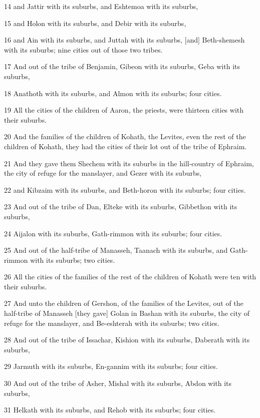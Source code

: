 \par 14 and Jattir with its suburbs, and Eshtemoa with its suburbs,
\par 15 and Holon with its suburbs, and Debir with its suburbs,
\par 16 and Ain with its suburbs, and Juttah with its suburbs, [and] Beth-shemesh with its suburbs; nine cities out of those two tribes.
\par 17 And out of the tribe of Benjamin, Gibeon with its suburbs, Geba with its suburbs,
\par 18 Anathoth with its suburbs, and Almon with its suburbs; four cities.
\par 19 All the cities of the children of Aaron, the priests, were thirteen cities with their suburbs.
\par 20 And the families of the children of Kohath, the Levites, even the rest of the children of Kohath, they had the cities of their lot out of the tribe of Ephraim.
\par 21 And they gave them Shechem with its suburbs in the hill-country of Ephraim, the city of refuge for the manslayer, and Gezer with its suburbs,
\par 22 and Kibzaim with its suburbs, and Beth-horon with its suburbs; four cities.
\par 23 And out of the tribe of Dan, Elteke with its suburbs, Gibbethon with its suburbs,
\par 24 Aijalon with its suburbs, Gath-rimmon with its suburbs; four cities.
\par 25 And out of the half-tribe of Manasseh, Taanach with its suburbs, and Gath-rimmon with its suburbs; two cities.
\par 26 All the cities of the families of the rest of the children of Kohath were ten with their suburbs.
\par 27 And unto the children of Gershon, of the families of the Levites, out of the half-tribe of Manasseh [they gave] Golan in Bashan with its suburbs, the city of refuge for the manslayer, and Be-eshterah with its suburbs; two cities.
\par 28 And out of the tribe of Issachar, Kishion with its suburbs, Daberath with its suburbs,
\par 29 Jarmuth with its suburbs, En-gannim with its suburbs; four cities.
\par 30 And out of the tribe of Asher, Mishal with its suburbs, Abdon with its suburbs,
\par 31 Helkath with its suburbs, and Rehob with its suburbs; four cities.
